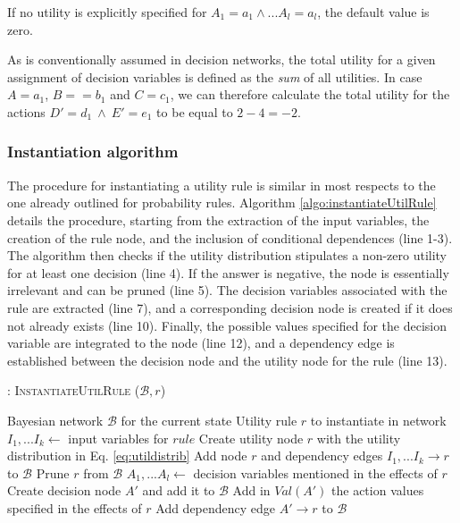 If no utility is explicitly specified for $A_1\!=\!a_1 \land... A_l\!=\!a_l$, the default value is zero. 

As is conventionally assumed in decision networks, the total utility for a given assignment of decision variables is defined as the \textit{sum} of all utilities.  In case $A\!=\!a_1$, $B=\!=\!b_1$ and $C\!=\!c_1$, we can therefore calculate the total utility for the actions $D'\!=\!d_1 \ \land \ E'\!=\!e_1$ to be equal to $2 - 4 = -2$. 


\subsubsection*{Instantiation algorithm} 

The procedure for instantiating a utility rule is similar in most respects to the one already outlined for probability rules. Algorithm \ref{algo:instantiateUtilRule} details the procedure, starting from the extraction of the input variables, the creation of the rule node, and the inclusion of conditional dependences (line 1-3). The algorithm then checks if the utility distribution stipulates a non-zero utility for at least one decision (line 4).  If the answer is negative, the node is essentially irrelevant and can be pruned (line 5).  The decision variables associated with the rule are extracted (line 7), and a corresponding decision node is created if it does not already exists (line 10). Finally, the possible values specified for the decision variable are integrated to the node (line 12), and a dependency edge is established between the decision node and the utility node for the rule (line 13). 

\begin{algorithm}[h!]
\caption{: \textsc{InstantiateUtilRule} ($\mathcal{B}, \mathit{r}$)}
\begin{algorithmic}[1] \vspace{1mm}
\REQUIRE Bayesian network $\mathcal{B}$ for the current state
\REQUIRE Utility rule $\mathit{r}$ to instantiate in network  \vspace{1mm}
\STATE $I_1,...I_k \leftarrow $ input variables for $rule$
\STATE Create utility node $r$ with the utility distribution in Eq. \eqref{eq:utildistrib}
\STATE Add node $r$ and dependency edges $I_1,...I_k \rightarrow r$ to $\mathcal{B}$ 
\STATE Prune $r$ from $\mathcal{B}$
\ELSE
\STATE $A_1,...A_l \leftarrow$ decision variables mentioned in the effects of $r$
\STATE Create decision node $A'$ and add it to $\mathcal{B}$
\ENDIF
\STATE Add in $Val(A')$ the action values specified in the effects of $r$
\STATE Add dependency edge $A' \rightarrow r$ to $\mathcal{B}$ 
\ENDFOR
\ENDIF
\end{algorithmic}
\label{algo:instantiateUtilRule}
\end{algorithm}

